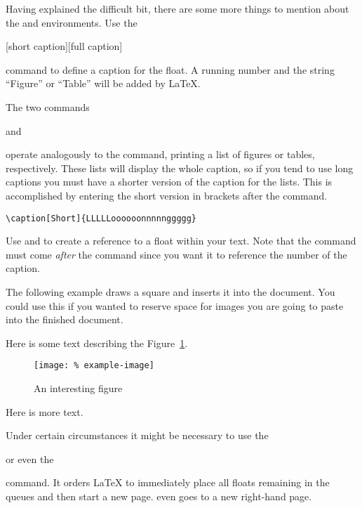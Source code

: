 Having explained the difficult bit, there are some more things to mention about
the  and  environments. Use the
\begin{lscommand}
  [short caption][full caption]
\end{lscommand}
command to define a caption for the float. A running number and
the string \enquote{Figure} or \enquote{Table} will be added by \LaTeX.

The two commands
\begin{lscommand}
   and 
\end{lscommand}
operate analogously to the  command, printing a list of
figures or tables, respectively.  These lists will display the whole caption,
so if you tend to use long captions you must have a shorter version of the
caption for the lists. This is accomplished by entering the short version in
brackets after the  command.
\begin{code}
\verb|\caption[Short]{LLLLLoooooonnnnnggggg}|
\end{code}

Use  and  to create a reference to a float within
your text. Note that the  command must come \emph{after} the
 command since you want it to reference the number of the
caption.

The following example draws a square and inserts it into the
document. You could use this if you wanted to reserve space for images
you are going to paste into the finished document.

\begin{example}[standalone, paperheight=4.5cm, to_page=2, vertical_pages]
\usepackage{graphicx} %
\geometry{includefoot} %
\listoffigures
\vspace{.3cm}%

Here is some text describing
the Figure~\ref{figure}.

\begin{figure}
  \centering
  \texttt{[image: \%
    example-image]}
  \caption{An interesting figure}%
  \label{figure}
\end{figure}

Here is more text.
\end{example}

Under certain circumstances it might be necessary to use the
\begin{lscommand}
   or even the 
\end{lscommand}
command. It orders \LaTeX{} to immediately place all floats remaining in the
queues and then start a new page.  even goes to a new
right-hand page.


